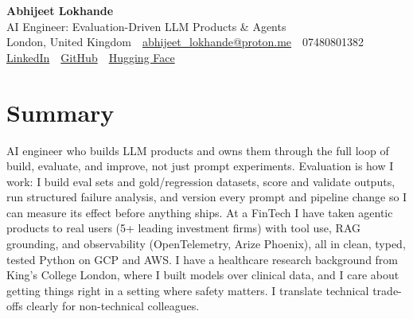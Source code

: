 \documentclass[10pt,a4paper]{article}
\newcommand{\sep}{\,\textcolor{accent!60}{\textbar}\,}
\begin{document}
\begin{center}
  {\fontsize{24}{26}\selectfont\bfseries Abhijeet Lokhande}\\[3pt]
  {\color{accent}\large AI Engineer: Evaluation-Driven LLM Products \& Agents}\\[5pt]
  {\small
    London, United Kingdom \sep
    \href{mailto:abhijeet_lokhande@proton.me}{abhijeet\_lokhande@proton.me} \sep
    07480801382 \\[2pt]
    \href{https://www.linkedin.com/in/ablds/}{LinkedIn} \sep
    \href{https://github.com/abhijeetscode}{GitHub} \sep
    \href{https://huggingface.co/ab-ai}{Hugging Face}
  }
\end{center}
\vspace{2pt}

\section{Summary}
AI engineer who builds LLM products and owns them through the full loop of build, evaluate, and improve, not just prompt experiments. Evaluation is how I work: I build eval sets and gold/regression datasets, score and validate outputs, run structured failure analysis, and version every prompt and pipeline change so I can measure its effect before anything ships. At a FinTech I have taken agentic products to real users (5+ leading investment firms) with tool use, RAG grounding, and observability (OpenTelemetry, Arize Phoenix), all in clean, typed, tested Python on GCP and AWS. I have a healthcare research background from King's College London, where I built models over clinical data, and I care about getting things right in a setting where safety matters. I translate technical trade-offs clearly for non-technical colleagues.

\end{document}
